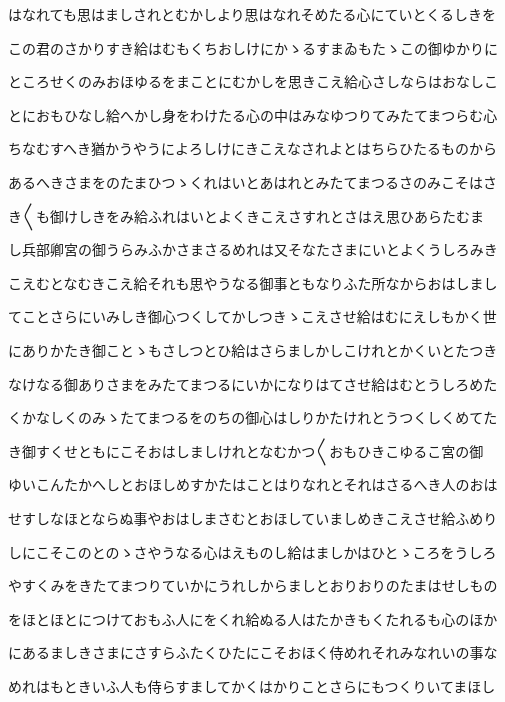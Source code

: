 \documentclass[a4paper,11pt,landscape]{ltjtarticle}
\begin{document}
はなれても思はましされとむかしより思はなれそめたる心にていとくるしきを
\par\medskip
この君のさかりすき給はむもくちおしけにかゝるすまゐもたゝこの御ゆかりに
\par\medskip
ところせくのみおほゆるをまことにむかしを思きこえ給心さしならはおなしこ
\par\medskip
とにおもひなし給へかし身をわけたる心の中はみなゆつりてみたてまつらむ心
\par\medskip
ちなむすへき猶かうやうによろしけにきこえなされよとはちらひたるものから
\par\medskip
あるへきさまをのたまひつゝくれはいとあはれとみたてまつるさのみこそはさ
\par\medskip
き〱も御けしきをみ給ふれはいとよくきこえさすれとさはえ思ひあらたむま
\par\medskip
し兵部卿宮の御うらみふかさまさるめれは又そなたさまにいとよくうしろみき
\par\medskip
こえむとなむきこえ給それも思やうなる御事ともなりふた所なからおはしまし
\par\medskip
てことさらにいみしき御心つくしてかしつきゝこえさせ給はむにえしもかく世
\par\medskip
にありかたき御ことゝもさしつとひ給はさらましかしこけれとかくいとたつき
\par\medskip
なけなる御ありさまをみたてまつるにいかになりはてさせ給はむとうしろめた
\par\medskip
くかなしくのみゝたてまつるをのちの御心はしりかたけれとうつくしくめてた
\par\medskip
き御すくせともにこそおはしましけれとなむかつ〱おもひきこゆるこ宮の御
\par\medskip
ゆいこんたかへしとおほしめすかたはことはりなれとそれはさるへき人のおは
\par\medskip
せすしなほとならぬ事やおはしまさむとおほしていましめきこえさせ給ふめり
\par\medskip
しにこそこのとのゝさやうなる心はえものし給はましかはひとゝころをうしろ
\par\medskip
やすくみをきたてまつりていかにうれしからましとおりおりのたまはせしもの
\par\medskip
をほとほとにつけておもふ人にをくれ給ぬる人はたかきもくたれるも心のほか
\par\medskip
にあるましきさまにさすらふたくひたにこそおほく侍めれそれみなれいの事な
\par\medskip
めれはもときいふ人も侍らすましてかくはかりことさらにもつくりいてまほし
\par\medskip
\end{document}
